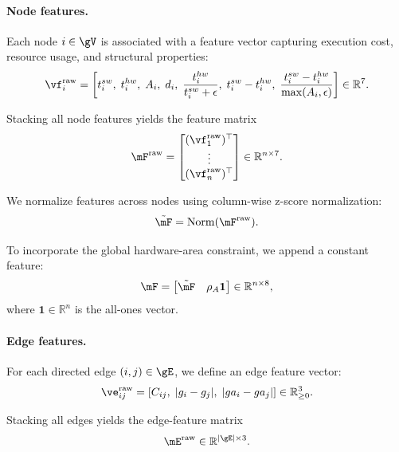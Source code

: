 \paragraph{\textbf{Node features.}}
Each node $i \in \gV$ is associated with a feature vector capturing execution cost, resource usage, and structural properties:
\begin{equation}
\vf_i^{\mathrm{raw}} =
\left[
t_i^{sw},\;
t_i^{hw},\;
A_i,\;
d_i,\;
\frac{t_i^{hw}}{t_i^{sw}+\epsilon},\;
t_i^{sw}-t_i^{hw},\;
\frac{t_i^{sw}-t_i^{hw}}{\max(A_i,\epsilon)}
\right]
\in \mathbb{R}^7.
\end{equation}

Stacking all node features yields the feature matrix
\begin{equation}
\mF^{\mathrm{raw}} =
\begin{bmatrix}
(\vf_1^{\mathrm{raw}})^\top\\
\vdots\\
(\vf_n^{\mathrm{raw}})^\top
\end{bmatrix}
\in \mathbb{R}^{n \times 7}.
\end{equation}

We normalize features across nodes using column-wise z-score normalization:
\begin{equation}
\tilde{\mF} = \mathrm{Norm}(\mF^{\mathrm{raw}}).
\end{equation}

To incorporate the global hardware-area constraint, we append a constant feature:
\begin{equation}
\mF =
\begin{bmatrix}
\tilde{\mF} & \rho_A \mathbf{1}
\end{bmatrix}
\in \mathbb{R}^{n \times 8},
\end{equation}
where $\mathbf{1}\in\mathbb{R}^{n}$ is the all-ones vector.

\paragraph{\textbf{Edge features.}}
For each directed edge $(i,j) \in \gE$, we define an edge feature vector:
\begin{equation}
\ve_{ij}^{\mathrm{raw}} =
\left[
C_{ij},\;
|g_i - g_j|,\;
|ga_i - ga_j|
\right]
\in \mathbb{R}_{\ge 0}^3.
\end{equation}

Stacking all edges yields the edge-feature matrix
\begin{equation}
\mE^{\mathrm{raw}} \in \mathbb{R}^{|\gE| \times 3}.
\end{equation}

